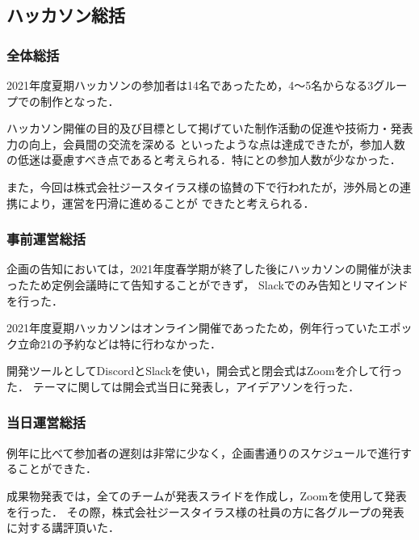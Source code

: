 \subsection*{ハッカソン総括}


\subsubsection*{全体総括}

2021年度夏期ハッカソンの参加者は14名であったため，4〜5名からなる3グループでの制作となった．

ハッカソン開催の目的及び目標として掲げていた制作活動の促進や技術力・発表力の向上，会員間の交流を深める
といったような点は達成できたが，参加人数の低迷は憂慮すべき点であると考えられる．特に\firstGrade{}と\secondGrade{}の参加人数が少なかった．

また，今回は株式会社ジースタイラス様の協賛の下で行われたが，渉外局との連携により，運営を円滑に進めることが
できたと考えられる．

\subsubsection*{事前運営総括}

企画の告知においては，2021年度春学期が終了した後にハッカソンの開催が決まったため定例会議時にて告知することができず，
Slackでのみ告知とリマインドを行った．

2021年度夏期ハッカソンはオンライン開催であったため，例年行っていたエポック立命21の予約などは特に行わなかった．

開発ツールとしてDiscordとSlackを使い，開会式と閉会式はZoomを介して行った．
テーマに関しては開会式当日に発表し，アイデアソンを行った．

\subsubsection*{当日運営総括}

例年に比べて参加者の遅刻は非常に少なく，企画書通りのスケジュールで進行することができた．

成果物発表では，全てのチームが発表スライドを作成し，Zoomを使用して発表を行った．
その際，株式会社ジースタイラス様の社員の方に各グループの発表に対する講評頂いた．
